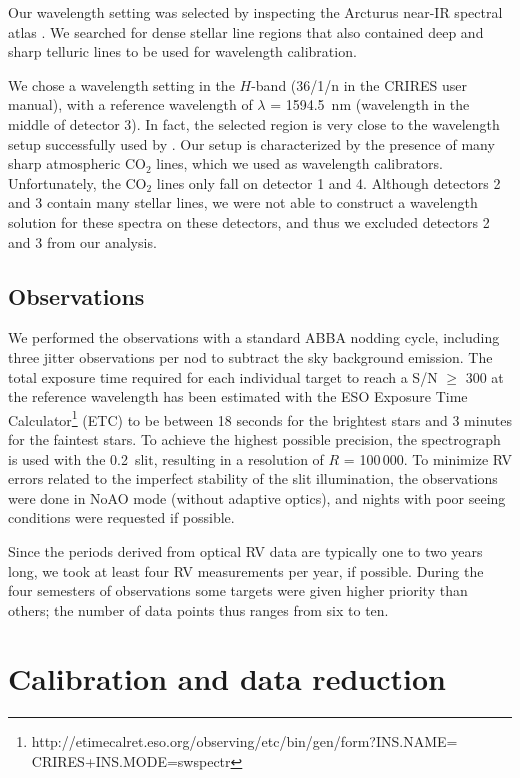 \documentclass{aa}
\begin{document}
Our wavelength setting was selected by inspecting the Arcturus near-IR spectral atlas \citep{Hinkle1995}. 
We searched for dense stellar line regions that also contained deep and sharp telluric lines to be used for wavelength calibration. 

We chose a wavelength setting in the $H$-band (36/1/n in the CRIRES user manual), 
with a reference wavelength of $\lambda$ = 1594.5~nm (wavelength in the middle of detector 3). 
In fact, the selected region is very close to the wavelength setup 
successfully used by \citet{Figueira}. Our setup is characterized by the presence 
of many sharp atmospheric CO$_2$ lines, which we used as wavelength calibrators. 
Unfortunately, the CO$_2$ lines only fall  on detector 1 and 4.
Although detectors 2 and 3 contain many stellar lines, we were not able to construct
a wavelength solution for these spectra on these detectors, and thus we excluded 
detectors 2 and 3 from our analysis. 
 
 
\subsection{Observations}
\label{ObservationsCRIRES} 


We performed the observations {}with a standard ABBA nodding cycle, including three jitter observations per nod 
 to subtract the sky background emission. The total exposure time required for each individual target to 
reach a S/N $\geq$ 300 at the reference wavelength has been estimated with the ESO Exposure Time 
Calculator\footnote{http://etimecalret.eso.org/observing/etc/bin/gen/form?INS.NAME= CRIRES+INS.MODE=swspectr} (ETC) 
to be between 18 seconds for the brightest stars and 3 minutes for the faintest stars. To achieve the highest 
possible precision, the spectrograph is used with the 0.2\arcsec~slit, resulting in a resolution of $R$ = 100\,000.
To minimize RV errors related to the imperfect stability of the slit illumination,
the observations were done in NoAO mode (without adaptive optics), and nights with poor seeing conditions were requested if possible.

Since the periods derived from optical RV data are typically one to two years long, 
we took at least four RV measurements per year, if possible.
During the four semesters of observations some targets were given higher
priority than others; the number of data points thus ranges from  six to ten.


\section{Calibration and data reduction}
\label{Calibration and data reduction}
 
\end{document}
